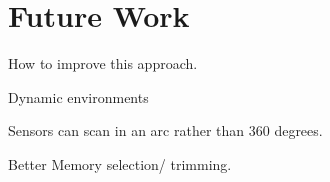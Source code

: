 

\chapter{Future Work}
How to improve this approach.

Dynamic environments


Sensors can scan in an arc rather than 360 degrees.


Better Memory selection/ trimming.
